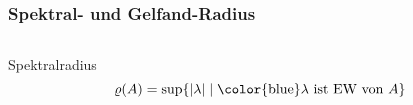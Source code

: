 %
%
%
\bgroup
{}
\def\eigenwert#1#2{
	\fill[color=blue!30] (#1:#2) circle[radius=0.05];
	\draw[color=blue] (#1:#2) circle[radius=0.05];
}
\begin{frame}[t]
\setlength{\abovedisplayskip}{5pt}
\setlength{\belowdisplayskip}{5pt}
\frametitle{Spektral- und Gelfand-Radius}
\vspace{-15pt}
\begin{columns}[t,onlytextwidth] \begin{column}{0.48\textwidth}
\begin{block}{Spektralradius}
\vspace{-10pt}
\[
\varrho(A)
=
\sup\{|\lambda|\;|\; \text{{\color{blue}$\lambda$} ist EW von $A$}\}
\]
\begin{center}
\end{center}
\end{block}
\end{column}
\end{columns}
\end{frame}
